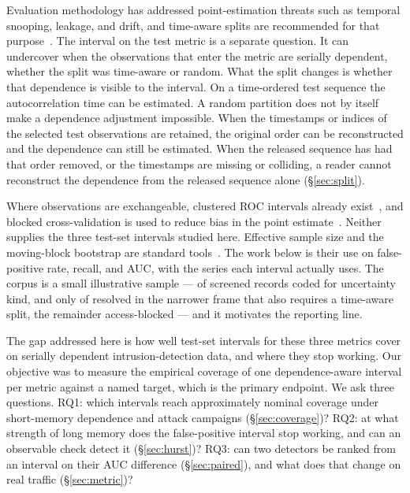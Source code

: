 \documentclass[a4paper,fleqn]{cas-dc}
\begin{document}
Evaluation methodology has addressed point-estimation threats such as temporal snooping, leakage,
and drift, and time-aware splits are recommended for that
purpose~\citep{arp2022dos,pendlebury2019tesseract,lew2026deployment,gama2014survey}. The interval on the test
metric is a separate question. It can undercover when the observations that enter the metric are
serially dependent, whether the split was time-aware or random. What the split changes is whether
that dependence is visible to the interval. On a time-ordered test sequence the autocorrelation
time can be estimated. A random partition does not by itself make a dependence adjustment
impossible. When the timestamps or indices of the selected test observations are retained, the
original order can be reconstructed and the dependence can still be estimated. When the released
sequence has had that order removed, or the timestamps are missing or colliding, a reader cannot
reconstruct the dependence from the released sequence alone (\S\ref{sec:split}).

Where observations are exchangeable, clustered ROC intervals already
exist~\citep{bay2023dependency,obuchowski1997nonparametric}, and blocked cross-validation is used to
reduce bias in the point estimate~\citep{roberts2017cross,bergmeir2012use}. Neither supplies the three test-set intervals
studied here. Effective sample size and the moving-block bootstrap are standard
tools~\citep{geyer1992practical,kunsch1989jackknife}. The work
below is their use on false-positive rate, recall, and AUC, with the series each interval actually
uses. The corpus is a small illustrative sample --- \NsfTwoRes{} of \NsfTwo{} screened records coded for
uncertainty kind, and only \NinframeRes{} of \Ninframe{} resolved in the narrower frame that also
requires a time-aware split, the remainder access-blocked --- and it motivates the reporting line.

The gap addressed here is how well test-set intervals for these three metrics cover on serially
dependent intrusion-detection data, and where they stop working. Our objective was to measure the
empirical coverage of one dependence-aware interval per metric against a named target, which is the
primary endpoint. We ask three questions. RQ1: which intervals reach approximately nominal coverage
under short-memory dependence and attack campaigns (\S\ref{sec:coverage})? RQ2: at what strength of
long memory does the false-positive interval stop working, and can an observable check detect it
(\S\ref{sec:hurst})? RQ3: can two detectors be ranked from an interval on their AUC difference
(\S\ref{sec:paired}), and what does that change on real traffic (\S\ref{sec:metric})?
\end{document}
